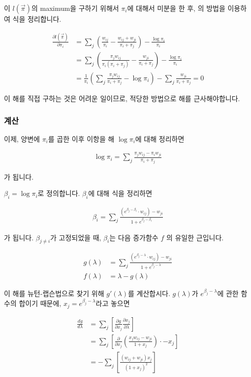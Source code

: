 \documentclass{article}
\begin{document}
이 $l(\vec{\pi})$의 maximum을 구하기 위해서 $\pi_i$에 대해서 미분을 한 후, \cite{jmlr}의 방법을 이용하여 식을 정리합니다.


\begin{align*}
\frac{\partial l(\vec{\pi})}{\partial \pi_i} &= \sum_j \left(\frac{w_{ij}}{\pi_i} - \frac{w_{ij} + w_{ji}}{\pi_i+\pi_j}\right) - \frac{\log \pi_i}{\pi_i} \\
&= \sum_j \left(\frac{\pi_j w_{ij}}{\pi_i (\pi_i + \pi_j)} - \frac{w_{ji}}{\pi_i + \pi_j} \right) - \frac{\log \pi_i}{\pi_i} \\
&= \frac{1}{\pi_i} \left(\sum_j\frac{\pi_jw_{ij}}{\pi_i + \pi_j} - \log \pi_i\right) - \sum_j \frac{w_{ji}}{\pi_i + \pi_j} = 0
\end{align*}

이 해를 직접 구하는 것은 어려운 일이므로, 적당한 방법으로 해를 근사해야합니다.

\subsubsection{계산}

이제, 양변에 $\pi_i$를 곱한 이후 이항을 해 $\log \pi_i$에 대해 정리하면

\begin{align*}
\log{\pi_i} = \sum_j \frac{\pi_j w_{ij} - \pi_i w_{ji}}{\pi_i + \pi_j}
\end{align*}

가 됩니다.


$\beta_i = \log{\pi_i}$로 정의합니다. $\beta_i$에 대해 식을 정리하면

\begin{align*}
\beta_i = \sum_j \frac{\left(e^{\beta_j-\beta_i} \cdot w_{ij}\right) - w_{ji}}{1 + e^{\beta_j-\beta_i}}
\end{align*}

가 됩니다. $\beta_{j \ne i}$가 고정되었을 때, $\beta_i$는 다음 증가함수 $f$ 의 유일한 근입니다.

\begin{align*}
g(\lambda) & =  \sum_j \frac{\left(e^{\beta_j-\lambda} \cdot w_{ij}\right) - w_{ji}}{1 + e^{\beta_j-\lambda}} \\
f(\lambda) & = \lambda - g(\lambda)
\end{align*}


이 해를 뉴턴-랩슨법으로 찾기 위해 $g'(\lambda)$를 계산합시다. $g(\lambda)$가 $e^{\beta_j - \lambda}$에 관한 함수의 합이기 때문에, $x_j=e^{\beta_j - \lambda}$라고 놓으면

\begin{align*}
\frac{dg}{ d\lambda} & = \sum_j\left[\frac{\partial g}{\partial x_j}\frac{\partial x_j}{\partial\lambda}\right] \\
& = \sum_j \left[\frac\partial {\partial x_j} \left(\frac{x_j w_{ij} - w_{ji}}{1 + x_j}\right) \cdot -x_j \right] \\
& = - \sum_j \left[\frac{ (w_{ij} + w_{ji})x_j}{(1+x_j)^2} \right]
\end{align*}
\end{document}
